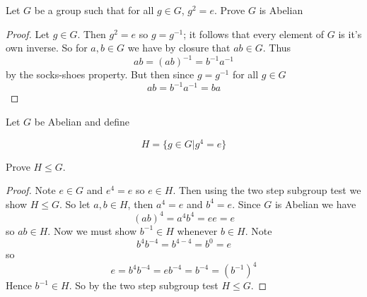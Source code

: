 \documentclass[11pt,largemargins]{homework}
\begin{document}
\maketitle

\question
Let $G$ be a group such that for all $g \in G$, $g^2 = e$. Prove $G$ is Abelian

\begin{proof}
    Let $g \in G$. Then $g^2 = e$ so $g = g^{-1}$; it follows that 
    every element of $G$ is it's own inverse. So for $a, b \in G$ we have 
    by closure that $ab \in G$. Thus 
    \[ ab = (ab)^{-1} = b^{-1}a^{-1} \]
    by the socks-shoes property. But then since $g = g^{-1}$ for all $g \in G$
    \[ab = b^{-1}a^{-1} = ba \]
\end{proof}

\question
Let $G$ be Abelian and define 

\[H = \{ g \in G | g^4 = e \}\] 

Prove $H \leq G$. 

\begin{proof}
    Note $e \in G$ and $e^4 = e$ so $e \in H$. Then using the two step subgroup test we show $H \leq G$. 
    So let $a, b \in H$, then $a^4 = e$ and $b^4 = e$. Since $G$ is Abelian we have 
    \[ (ab)^4 = a^4b^4 = ee = e \] 
    so $ab \in H$. Now we must show $b^{-1} \in H$ whenever $b \in H$. Note 
    \[b^4b^{-4} = b^{4-4} = b^0 = e \]
    so 
    \[e = b^4b^{-4} = eb^{-4} = b^{-4} = (b^{-1})^4\] 
    Hence $b^{-1} \in H$. So by the two step subgroup test $H \leq G$. 
\end{proof}
\end{document}
